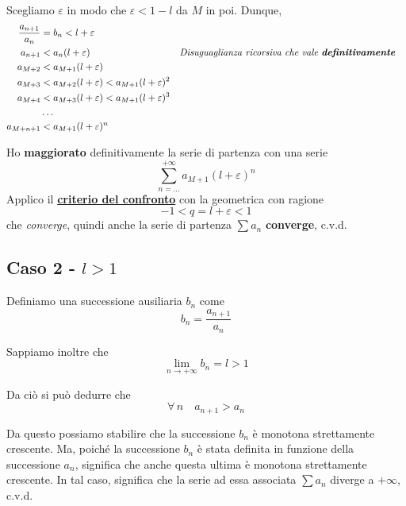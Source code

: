 \documentclass[../../dimostrazioni]{subfiles}
\begin{document}
                Scegliamo \(\varepsilon\) in modo che \(\varepsilon < 1 - l\) da \(M\) in poi. Dunque,
                \begin{align*}
                    \frac{a_{n+1}}{a_n} &= b_n < l + \varepsilon \\
                    a_{n+1} &< a_n(l + \varepsilon) && \text{\emph{Disuguaglianza ricorsiva che vale \textbf{definitivamente}}} \\
                    a_{M+2} &< a_{M+1} (l + \varepsilon) \\
                    a_{M+3} &< a_{M+2} (l + \varepsilon) < a_{M+1}(l + \varepsilon)^{2}\\
                    a_{M+4} &< a_{M+3} (l + \varepsilon) < a_{M+1}(l + \varepsilon)^{3} \\
                    &\dots \\
                    a_{M+n+1} &< a_{M+1}(l + \varepsilon)^n
                \end{align*}

                Ho \textbf{maggiorato} definitivamente la serie di partenza con una serie
                \[ \sum_{n=\dots}^{+\infty} a_{M+1}(l + \varepsilon)^{n}\] 
                Applico il \textbf{\hyperref[serieconfronto]{criterio del confronto}} con la geometrica con ragione
                \[-1 < q = l + \varepsilon < 1 \]
                che \emph{converge}, quindi anche la serie di partenza \(\sum a_n \) \textbf{converge}, c.v.d.

            \subsection*{Caso 2 - \(l > 1\)}
                
                Definiamo una successione ausiliaria \(b_n\) come
                \[b_n = \frac{a_{n+1}}{a_n}\]

                Sappiamo inoltre che
                \[ \lim_{n \to +\infty}b_n = l > 1 \]

                Da ciò si può dedurre che
                \[\forall \, n \quad a_{n + 1} > a_n\]

                Da questo possiamo stabilire che la successione \(b_n\) è monotona strettamente crescente. Ma,
                poiché la successione \(b_n\) è stata definita in funzione della successione \(a_n\), significa
                che anche questa ultima è monotona strettamente crescente. In tal caso, significa che la serie ad
                essa associata \(\sum a_n\) diverge a \(+\infty\), c.v.d.
                
\end{document}
